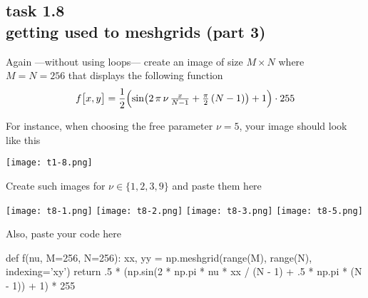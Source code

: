 
\subsection*{task 1.8 \\[1ex] getting used to meshgrids (part 3)}

Again ---without using  loops--- create an image of size $M \times N$ where $M = N = 256$ that displays the following function
\begin{equation*}
f \bigl[ x, y \bigr] = \frac{1}{2} \Bigl( \sin \bigl( 2\,\pi\,\nu \, \tfrac{x}{N-1} + \tfrac{\pi}{2} \, (N-1)\bigr) + 1 \Bigr) \cdot 255
\end{equation*}

For instance, when choosing the free parameter $\nu = 5$, your image should look like this
\begin{center}
\texttt{[image: t1-8.png]} 
\end{center}

\vspace{1cm}
Create such images for $\nu \in \{ 1, 2, 3, 9 \}$ and paste them here
\begin{center}
\texttt{[image: t8-1.png]} \hfill
\texttt{[image: t8-2.png]} \hfill
\texttt{[image: t8-3.png]} \hfill
\texttt{[image: t8-5.png]} 
\end{center}



\newpage
Also, paste your code here \\[1ex]
\begin{python}
def f(nu, M=256, N=256):
    xx, yy = np.meshgrid(range(M), range(N), indexing='xy')
    return .5 * (np.sin(2 * np.pi * nu * xx / (N - 1) + .5 * np.pi * (N - 1)) + 1) * 255

\end{python}





